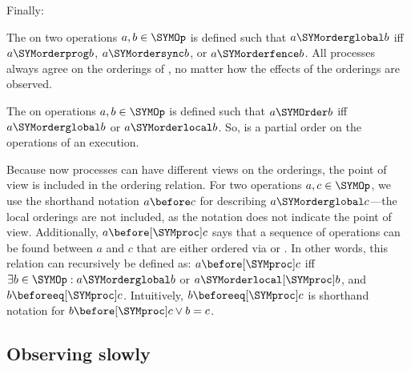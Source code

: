 Finally:
\begin{definition}\label{def:memory:global_order}
	The  \SYMorderglobal* on two operations $a,b\in\SYMOp$ is defined such that $a\SYMorderglobal b$ iff $a\SYMorderprog b$, $a\SYMordersync b$, or $a\SYMorderfence b$.
	All processes always agree on the orderings of \SYMorderglobal, no matter how the effects of the orderings are observed.
\end{definition}
\begin{definition}
	The  \SYMOrder* on operations $a,b\in\SYMOp$ is defined such that $a\SYMOrder b$ iff $a\SYMorderglobal b$ or $a\SYMorderlocal b$.
	So, \SYMOrder is a partial order on the operations \SYMOp of an execution.
\end{definition}


Because now processes can have different views on the orderings, the point of view is included in the ordering relation.
For two operations $a,c\in\SYMOp$, we use the shorthand notation $a\before c$ for describing $a\SYMorderglobal c$---the local orderings are not included, as the notation does not indicate the point of view.
Additionally, $a\before[\SYMproc]c$ says that a sequence of operations can be found between $a$ and $c$ that are either ordered via \SYMorderglobal or \SYMorderlocal[\SYMproc].
In other words, this relation can recursively be defined as:
	$a\before[\SYMproc]c$ iff $
	\exists b\in\SYMOp:
	a\SYMorderglobal b $ or $a\SYMorderlocal[\SYMproc]b$, and $b \beforeeq[\SYMproc] c$.
Intuitively, $b\beforeeq[\SYMproc] c$ is shorthand notation for $b\before[\SYMproc]c \vee b=c$.

\subsection{Observing slowly}
\label{s:memory:operation:properties}

